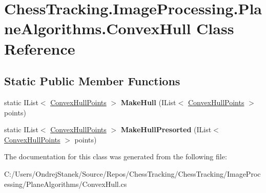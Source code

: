 \hypertarget{class_chess_tracking_1_1_image_processing_1_1_plane_algorithms_1_1_convex_hull}{}\section{Chess\+Tracking.\+Image\+Processing.\+Plane\+Algorithms.\+Convex\+Hull Class Reference}
\label{class_chess_tracking_1_1_image_processing_1_1_plane_algorithms_1_1_convex_hull}
\subsection*{Static Public Member Functions}
\begin{DoxyCompactItemize}
\item 
\mbox{\label{class_chess_tracking_1_1_image_processing_1_1_plane_algorithms_1_1_convex_hull_a3edf4f65da8ee0ea4c27ce7665208702}} 
static I\+List$<$ \mbox{\hyperlink{struct_chess_tracking_1_1_image_processing_1_1_plane_algorithms_1_1_convex_hull_points}{Convex\+Hull\+Points}} $>$ {\bfseries Make\+Hull} (I\+List$<$ \mbox{\hyperlink{struct_chess_tracking_1_1_image_processing_1_1_plane_algorithms_1_1_convex_hull_points}{Convex\+Hull\+Points}} $>$ points)
\item 
\mbox{\label{class_chess_tracking_1_1_image_processing_1_1_plane_algorithms_1_1_convex_hull_aeb774efbcfb7c7acd526598755f255b7}} 
static I\+List$<$ \mbox{\hyperlink{struct_chess_tracking_1_1_image_processing_1_1_plane_algorithms_1_1_convex_hull_points}{Convex\+Hull\+Points}} $>$ {\bfseries Make\+Hull\+Presorted} (I\+List$<$ \mbox{\hyperlink{struct_chess_tracking_1_1_image_processing_1_1_plane_algorithms_1_1_convex_hull_points}{Convex\+Hull\+Points}} $>$ points)
\end{DoxyCompactItemize}


The documentation for this class was generated from the following file\+:\begin{DoxyCompactItemize}
\item 
C\+:/\+Users/\+Ondrej\+Stanek/\+Source/\+Repos/\+Chess\+Tracking/\+Chess\+Tracking/\+Image\+Processing/\+Plane\+Algorithms/Convex\+Hull.\+cs\end{DoxyCompactItemize}
